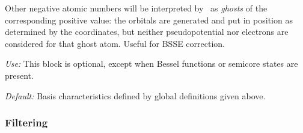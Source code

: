 \begin{description}
Other negative atomic numbers will be interpreted by \siesta\ as
\textit{ghosts}
of the corresponding positive value: the orbitals
are generated and put in position as determined by the coordinates,
but neither pseudopotential nor electrons are considered for that
ghost atom. Useful for BSSE correction.

\textit{Use:} This block is optional, except when Bessel functions or
semicore states are present.

\textit{Default:} Basis characteristics defined by global definitions given
above.

\end{description}

\subsubsection{Filtering}
\label{sec:filtering}

